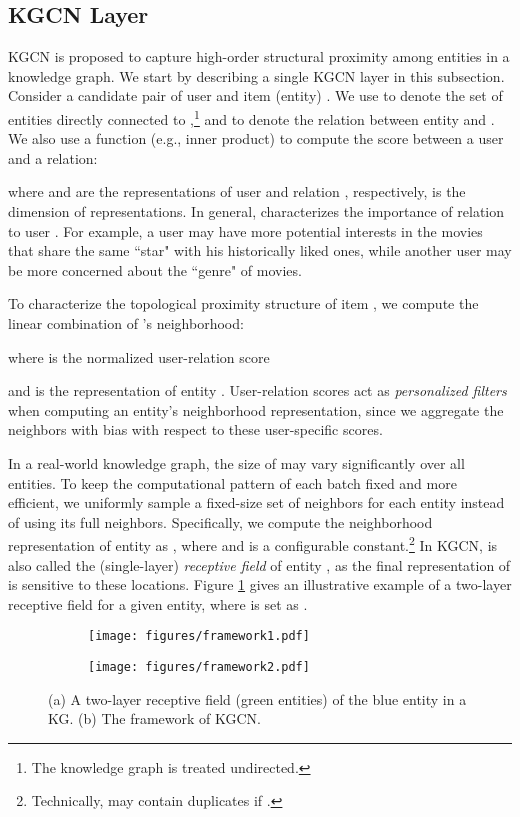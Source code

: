 \documentclass[sigconf]{acmart}
\begin{document}
	
	\subsection{KGCN Layer}
		KGCN is proposed to capture high-order structural proximity among entities in a knowledge graph.		
		We start by describing a single KGCN layer in this subsection.
		Consider a candidate pair of user  and item (entity) .
		We use  to denote the set of entities directly connected to ,\footnote{The knowledge graph  is treated undirected.} and  to denote the relation between entity  and .
		We also use a function  (e.g., inner product) to compute the score between a user and a relation:
		
		where  and  are the representations of user  and relation , respectively,  is the dimension of representations.
		In general,  characterizes the importance of relation  to user .
		For example, a user may have more potential interests in the movies that share the same ``star" with his historically liked ones, while another user may be more concerned about the ``genre" of movies.
		
		To characterize the topological proximity structure of item , we compute the linear combination of 's neighborhood:
		
		where  is the normalized user-relation score
		
		and  is the representation of entity .
		User-relation scores act as \textit{personalized filters} when computing an entity's neighborhood representation, since we aggregate the neighbors with bias with respect to these user-specific scores.
		
		In a real-world knowledge graph, the size of  may vary significantly over all entities.
		To keep the computational pattern of each batch fixed and more efficient, we uniformly sample a fixed-size set of neighbors for each entity instead of using its full neighbors.
		Specifically, we compute the neighborhood representation of entity  as , where  and  is a configurable constant.\footnote{Technically,  may contain duplicates if .}
		In KGCN,  is also called the (single-layer) \textit{receptive field} of entity , as the final representation of  is sensitive to these locations.
		Figure \ref{fig:framework1} gives an illustrative example of a two-layer receptive field for a given entity, where  is set as .
		
		\begin{figure}
			\centering
			\begin{subfigure}[b]{0.2\textwidth}
   				\texttt{[image: figures/framework1.pdf]}
   				\caption{}
   				\label{fig:framework1}
			\end{subfigure}
			\hfill
			\begin{subfigure}[b]{0.24\textwidth}
				\texttt{[image: figures/framework2.pdf]}
				\caption{}
				\label{fig:framework2}
			\end{subfigure}
			\caption{(a) A two-layer receptive field (green entities) of the blue entity in a KG. (b) The framework of KGCN.}	
			\label{fig:framework}
		\end{figure}
		
\end{document}
